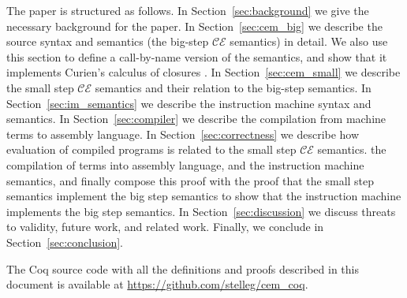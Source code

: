 The paper is structured as follows. In Section~\ref{sec:background} we give the
necessary background for the paper. In Section~\ref{sec:cem_big} we describe the
source syntax and semantics (the big-step $\mathcal{CE}$ semantics) in detail.
We also use this section to define a call-by-name version of the semantics, and
show that it implements Curien's calculus of closures \cite{curien}.  In
Section~\ref{sec:cem_small} we describe the small step $\mathcal{CE}$ semantics
and their relation to the big-step semantics. In Section~\ref{sec:im_semantics}
we describe the instruction machine syntax and semantics. In
Section~\ref{sec:compiler} we describe the compilation from machine terms to
assembly language. In Section~\ref{sec:correctness} we describe how evaluation
of compiled programs is related to the small step $\mathcal{CE}$ semantics. the
compilation of terms into assembly language, and the instruction machine
semantics, and finally compose this proof with the proof that the small step
semantics implement the big step semantics to show that the instruction machine
implements the big step semantics. In Section~\ref{sec:discussion} we discuss
threats to validity, future work, and related work. Finally, we conclude in
Section~\ref{sec:conclusion}.

The Coq source code with all the definitions and proofs described in this
document is available at \url{https://github.com/stelleg/cem\_coq}. 
